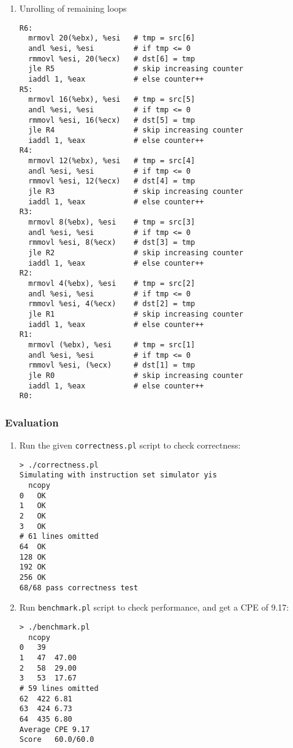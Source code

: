 \documentclass{article}
\begin{document}
\begin{enumerate}
  \item Unrolling of remaining loops
\begin{lstlisting}
R6:
  mrmovl 20(%ebx), %esi   # tmp = src[6]
  andl %esi, %esi         # if tmp <= 0
  rmmovl %esi, 20(%ecx)   # dst[6] = tmp
  jle R5                  # skip increasing counter
  iaddl 1, %eax           # else counter++
R5:
  mrmovl 16(%ebx), %esi   # tmp = src[5]
  andl %esi, %esi         # if tmp <= 0
  rmmovl %esi, 16(%ecx)   # dst[5] = tmp
  jle R4                  # skip increasing counter
  iaddl 1, %eax           # else counter++
R4:
  mrmovl 12(%ebx), %esi   # tmp = src[4]
  andl %esi, %esi         # if tmp <= 0
  rmmovl %esi, 12(%ecx)   # dst[4] = tmp
  jle R3                  # skip increasing counter
  iaddl 1, %eax           # else counter++
R3:
  mrmovl 8(%ebx), %esi    # tmp = src[3]
  andl %esi, %esi         # if tmp <= 0
  rmmovl %esi, 8(%ecx)    # dst[3] = tmp
  jle R2                  # skip increasing counter
  iaddl 1, %eax           # else counter++
R2:
  mrmovl 4(%ebx), %esi    # tmp = src[2]
  andl %esi, %esi         # if tmp <= 0
  rmmovl %esi, 4(%ecx)    # dst[2] = tmp
  jle R1                  # skip increasing counter
  iaddl 1, %eax           # else counter++
R1:
  mrmovl (%ebx), %esi     # tmp = src[1]
  andl %esi, %esi         # if tmp <= 0
  rmmovl %esi, (%ecx)     # dst[1] = tmp
  jle R0                  # skip increasing counter
  iaddl 1, %eax           # else counter++
R0:
\end{lstlisting}
\end{enumerate}

\subsubsection{Evaluation}

\begin{enumerate}
  \item Run the given \verb|correctness.pl| script to check correctness:
\begin{lstlisting}
> ./correctness.pl
Simulating with instruction set simulator yis
  ncopy
0	OK
1	OK
2	OK
3	OK
# 61 lines omitted
64	OK
128	OK
192	OK
256	OK
68/68 pass correctness test
\end{lstlisting}

  \item Run \verb|benchmark.pl| script to check performance, and get a CPE of 9.17:
\begin{lstlisting}
> ./benchmark.pl
  ncopy
0	39
1	47	47.00
2	58	29.00
3	53	17.67
# 59 lines omitted
62	422	6.81
63	424	6.73
64	435	6.80
Average CPE	9.17
Score	60.0/60.0
\end{lstlisting}
\end{enumerate}
\end{document}
